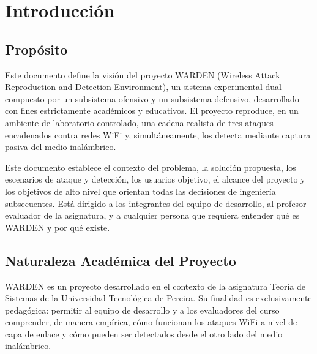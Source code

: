 \documentclass[11pt,a4paper]{article}
\begin{document}

\begin{wardenrevisions}
\end{wardenrevisions}

\tableofcontents
\newpage

\section{Introducción}

\subsection{Propósito}
Este documento define la visión del proyecto WARDEN (Wireless Attack
Reproduction and Detection Environment), un sistema experimental dual
compuesto por un subsistema ofensivo y un subsistema defensivo, desarrollado
con fines estrictamente académicos y educativos. El proyecto reproduce, en un
ambiente de laboratorio controlado, una cadena realista de tres ataques
encadenados contra redes WiFi y, simultáneamente, los detecta mediante
captura pasiva del medio inalámbrico.

Este documento establece el contexto del problema, la solución propuesta, los
escenarios de ataque y detección, los usuarios objetivo, el alcance del
proyecto y los objetivos de alto nivel que orientan todas las decisiones de
ingeniería subsecuentes. Está dirigido a los integrantes del equipo de
desarrollo, al profesor evaluador de la asignatura, y a cualquier persona que
requiera entender qué es WARDEN y por qué existe.

\subsection{Naturaleza Académica del Proyecto}
WARDEN es un proyecto desarrollado en el contexto de la asignatura Teoría de
Sistemas de la Universidad Tecnológica de Pereira. Su finalidad es
exclusivamente pedagógica: permitir al equipo de desarrollo y a los
evaluadores del curso comprender, de manera empírica, cómo funcionan los
ataques WiFi a nivel de capa de enlace y cómo pueden ser detectados desde el
otro lado del medio inalámbrico.
\end{document}

